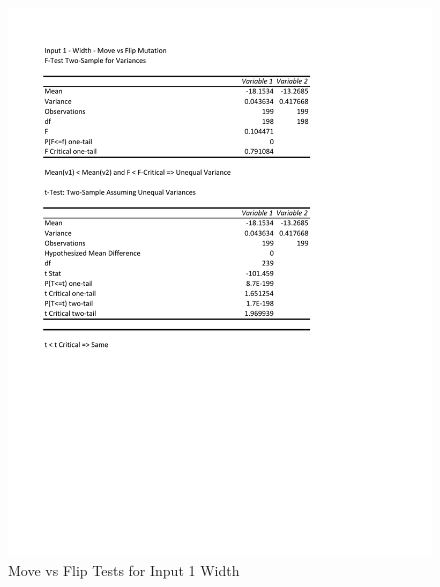 \documentclass[times]{article}
\begin{document}
	\begin{figure}
		\caption{Move vs Flip Tests for Input 1 Width}
		\label{fig:1mutation_moea}
		\includegraphics[width=\textwidth]{./t_test/1_mutation_moea.pdf}
	\end{figure}
\end{document}
